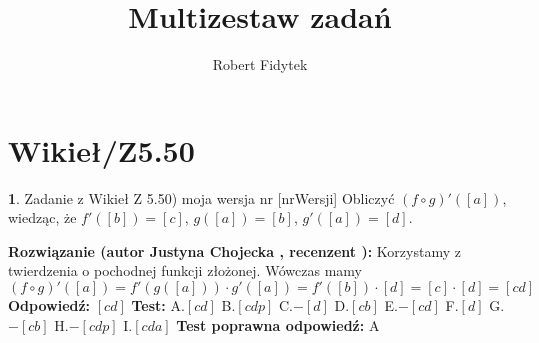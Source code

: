 \documentclass[12pt, a4paper]{article}
\title{Multizestaw zadań}
\author{Robert Fidytek}
\date{}
\theoremstyle{definition} %
\newtheorem{zad}{}
\newcommand{\kategoria}[1]{\section{#1}} %
\newcommand{\zadStart}[1]{\begin{zad}#1\newline} %
\newcommand{\zadStop}{\end{zad}}   %
\newcommand{\rozwStart}[2]{\noindent \textbf{Rozwiązanie (autor #1 , recenzent #2): }\newline} %
\newcommand{\rozwStop}{\newline}                                            %
\newcommand{\odpStart}{\noindent \textbf{Odpowiedź:}\newline}    %
\newcommand{\odpStop}{\newline}                                             %
\newcommand{\testStart}{\noindent \textbf{Test:}\newline} %
\newcommand{\testStop}{\newline} %
\newcommand{\kluczStart}{\noindent \textbf{Test poprawna odpowiedź:}\newline} %
\newcommand{\kluczStop}{\newline} %
\begin{document}
\maketitle


\kategoria{Wikieł/Z5.50}
\zadStart{Zadanie z Wikieł Z 5.50) moja wersja nr [nrWersji]}
Obliczyć $(f\circ g)'([a])$, wiedząc, że $f'([b])=[c]$, $g([a])=[b]$, $g'([a])=[d]$.
\zadStop
\rozwStart{Justyna Chojecka}{}
Korzystamy z twierdzenia o pochodnej funkcji złożonej. Wówczas mamy
$$(f\circ g)'([a])=f'\left(g([a])\right)\cdot g'([a])=f'([b])\cdot [d]=[c]\cdot [d]=[cd]$$
\rozwStop
\odpStart
$[cd]$
\odpStop
\testStart
A.$[cd]$
B.$[cdp]$
C.$-[d]$
D.$[cb]$
E.$-[cd]$
F.$[d]$
G.$-[cb]$
H.$-[cdp]$
I.$[cda]$
\testStop
\kluczStart
A
\kluczStop
\end{document}
